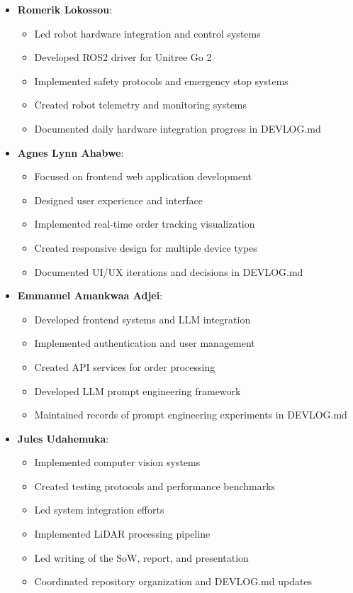 \documentclass[12pt]{article}
\begin{document}
\begin{itemize}
    \item \textbf{Romerik Lokossou}:
    \begin{itemize}
        \item Led robot hardware integration and control systems
        \item Developed ROS2 driver for Unitree Go 2
        \item Implemented safety protocols and emergency stop systems
        \item Created robot telemetry and monitoring systems
        \item Documented daily hardware integration progress in DEVLOG.md
    \end{itemize}
    
    \item \textbf{Agnes Lynn Ahabwe}:
    \begin{itemize}
        \item Focused on frontend web application development
        \item Designed user experience and interface
        \item Implemented real-time order tracking visualization
        \item Created responsive design for multiple device types
        \item Documented UI/UX iterations and decisions in DEVLOG.md
    \end{itemize}
    
    \item \textbf{Emmanuel Amankwaa Adjei}:
    \begin{itemize}
        \item Developed frontend systems and LLM integration
        \item Implemented authentication and user management
        \item Created API services for order processing
        \item Developed LLM prompt engineering framework
        \item Maintained records of prompt engineering experiments in DEVLOG.md
    \end{itemize}
    
    \item \textbf{Jules Udahemuka}:
    \begin{itemize}
        \item Implemented computer vision systems
        \item Created testing protocols and performance benchmarks
        \item Led system integration efforts
        \item Implemented LiDAR processing pipeline
        \item Led writing of the SoW, report, and presentation
        \item Coordinated repository organization and DEVLOG.md updates
    \end{itemize}
\end{itemize}
\end{document}
